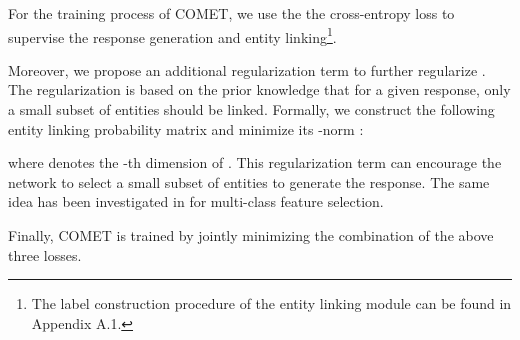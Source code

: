 \documentclass[11pt]{article}
\begin{document}
For the training process of COMET, we use the the cross-entropy loss to supervise the response generation and entity linking\footnote{The label construction procedure of the entity linking module can be found in Appendix A.1.}.


Moreover, we propose an additional regularization term to further regularize . The regularization is based on the prior knowledge that for a given response, only a small subset of entities should be linked. Formally, we construct 
the following entity linking probability matrix   and minimize its -norm \cite{nie2010efficient}:

where  denotes the -th dimension of . This regularization term can encourage the network to select a small subset of entities to generate the response. The same idea has been investigated in \cite{nie2010efficient} for multi-class feature selection.

Finally, COMET is trained by jointly minimizing the combination of the above three losses.


\begin{table*}[htb]
\centering
{}
\caption{BLEU and Entity F1 comparison of COMET with other counterparts. The best results are in \textbf{bold font} and the second-best results are \underline{underlined}. 
The results on the SMD and Multi-WOZ 2.1 datasets are adopted from \cite{qin-etal-2020-dynamic} and \cite{yang-etal-2020-graphdialog}, respectively.
}
\label{tab:results}
\end{table*}
\end{document}
